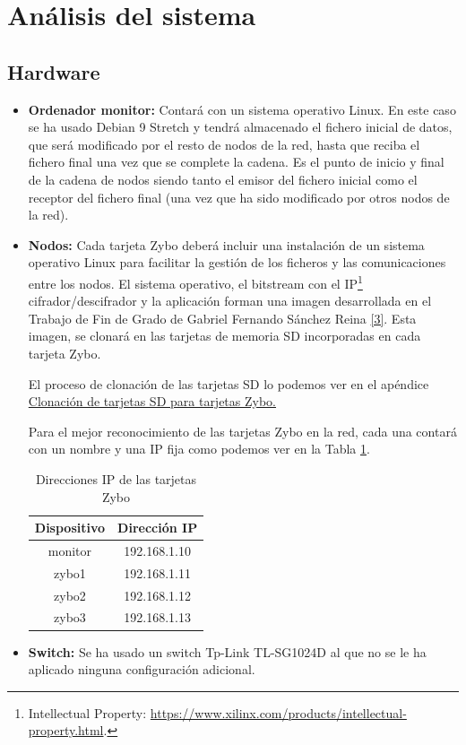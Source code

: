 \section{Análisis del sistema}
\subsection{Hardware}
\begin{itemize}
	\item \textbf{Ordenador monitor:} Contará con un sistema operativo Linux. En este caso se ha usado Debian 9 Stretch y tendrá almacenado el fichero inicial de datos, que será modificado por el resto de nodos de la red, hasta que reciba el fichero final una vez que se complete la cadena. Es el punto de inicio y final de la cadena de nodos siendo tanto el emisor del fichero inicial como el receptor del fichero final (una vez que ha sido modificado por otros nodos de la red).
	\item \textbf{Nodos:} Cada tarjeta Zybo deberá incluir una instalación de un sistema operativo Linux para facilitar la gestión de los ficheros y las comunicaciones entre los nodos. El sistema operativo, el bitstream con el IP\footnote{Intellectual Property: \url{https://www.xilinx.com/products/intellectual-property.html}.} cifrador/descifrador y la aplicación forman una imagen desarrollada en el Trabajo de Fin de Grado de Gabriel Fernando Sánchez Reina \hyperlink{3}{[3]}. Esta imagen, se clonará en las tarjetas de memoria SD incorporadas en cada tarjeta Zybo.
	
	El proceso de clonación de las tarjetas SD lo podemos ver en el apéndice \hyperlink{InstalacionLinux}{Clonación de tarjetas SD para tarjetas Zybo.}
	
	Para el mejor reconocimiento de las tarjetas Zybo en la red, cada una contará con un nombre y una IP fija como podemos ver en la Tabla \ref{Direcciones IP de las tarjetas Zybo}.
	\begin{table}[h]
		\centering
		\begin{tabular}{|c|c|}
			\hline
			\textbf{Dispositivo} & \textbf{Dirección IP} \\ \hline
			monitor & 192.168.1.10 \\ \hline
			zybo1 & 192.168.1.11 \\ \hline
			zybo2 & 192.168.1.12 \\ \hline
			zybo3 & 192.168.1.13 \\ \hline
		\end{tabular}
		\caption{Direcciones IP de las tarjetas Zybo}
		\label{Direcciones IP de las tarjetas Zybo}
	\end{table}
	\item \textbf{Switch:} Se ha usado un switch Tp-Link TL-SG1024D al que no se le ha aplicado ninguna configuración adicional.
\end{itemize}



